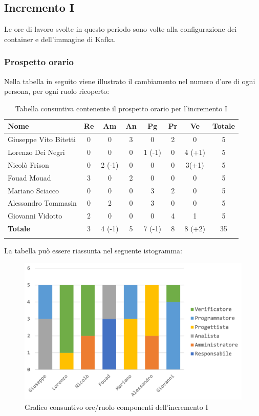 		\subsection{Incremento I}
		Le ore di lavoro svolte in questo periodo sono volte alla configurazione dei container e dell'immagine  di Kafka. 
		\subsubsection{Prospetto orario}
			Nella tabella in seguito viene illustrato il cambiamento nel numero d'ore di ogni persona, per ogni ruolo ricoperto:
			
			\begin{longtable}{|l|c|c|c|c|c|c|c|}
				\hline
				\rowcolor{lighter-grayer}
				\textbf{Nome} & \textbf{Re} & \textbf{Am} & \textbf{An} & \textbf{Pg}  & \textbf{Pr}   & \textbf{Ve} & \textbf{Totale} \\
				\hline
				\endfirsthead
				\hline
				Giuseppe Vito Bitetti & 0 & 0 & 3 & 0 & 2 & 0 & 5\\
				\hline
				\hline
				Lorenzo Dei Negri & 0 & 0 & 0 & 1 (-1) & 0 & 4 (+1) & 5\\
				\hline
				\hline
				Nicolò Frison & 0 & 2 (-1) & 0 & 0 & 0 & 3(+1) & 5\\
				\hline
				\hline
				Fouad Mouad & 3 & 0 & 2 & 0 & 0 & 0 & 5\\
				\hline
				\hline
				Mariano Sciacco & 0 & 0 & 0 & 3 & 2 & 0 & 5\\
				\hline
				\hline
				Alessandro Tommasin & 0 & 2 & 0 & 3 & 0 & 0 & 5\\
				\hline
				\hline
				Giovanni Vidotto & 2 & 0 & 0 & 0 & 4 & 1 & 5\\
				\hline 
				\textbf{Totale} & 3 &  4 (-1) & 5 & 7 (-1) & 8 & 8 (+2) & 35\\
				\hline 
				
				\caption{Tabella consuntiva contenente il prospetto orario per l'incremento I}
			\end{longtable}
			\pagebreak
			
			La tabella può essere riassunta nel seguente istogramma:
			
			\begin{figure}[H]
				\centering
				\includegraphics[width=0.8\linewidth]{images/consuntivo/ConsIncr1-1.png}
				\caption{Grafico consuntivo ore/ruolo componenti dell'incremento I}
				\label{fig:consuntivo grafico suddivione ruoli incremento I}
			\end{figure}
			
